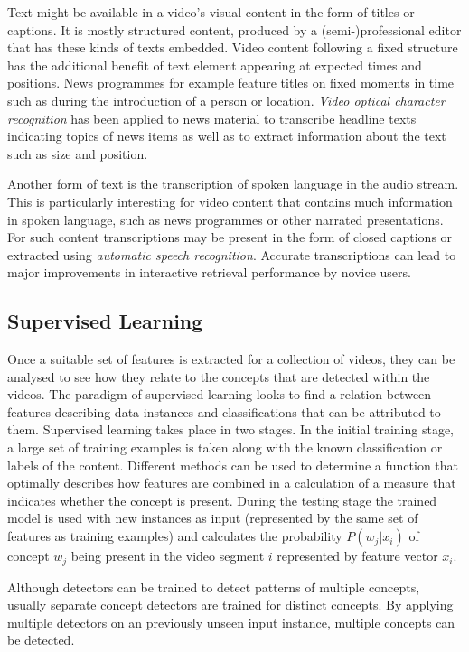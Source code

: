 Text might be available in a video's visual content in the form of titles or captions. It is mostly structured content, produced by a (semi-)professional editor that has these kinds of texts embedded. Video content following a fixed structure has the additional benefit of text element appearing at expected times and positions. News programmes for example feature titles on fixed moments in time such as during the introduction of a person or location. \emph{Video optical character recognition} has been applied to news material to transcribe headline texts indicating topics of news items as well as to extract information about the text such as size and position\cite{Kuwano:2000wy}.

Another form of text is the transcription of spoken language in the audio stream. This is particularly interesting for video content that contains much information in spoken language, such as news programmes or other narrated presentations. For such content transcriptions may be present in the form of closed captions or extracted using \emph{automatic speech recognition}. Accurate transcriptions can lead to major improvements in interactive retrieval performance by novice users\cite{Christel:2005td}.

\subsection{Supervised Learning}

Once a suitable set of features is extracted for a collection of videos, they can be analysed to see how they relate to the concepts that are detected within the videos. The paradigm of supervised learning looks to find a relation between features describing data instances and classifications that can be attributed to them. Supervised learning takes place in two stages. In the initial training stage, a large set of training examples is taken along with the known classification or labels of the content.  Different methods can be used to determine a function that optimally describes how features are combined in a calculation of a measure that indicates whether the concept is present. During the testing stage the trained model is used with new instances as input (represented by the same set of features as training examples) and calculates the probability $P(w_j | x_i)$ of concept $w_j$ being present in the video segment $i$ represented by feature vector $x_i$.

Although detectors can be trained to detect patterns of multiple concepts, usually separate concept detectors are trained for distinct concepts. By applying multiple detectors on an previously unseen input instance, multiple concepts can be detected.

